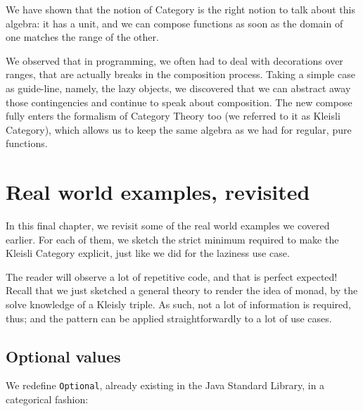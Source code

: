 \documentclass[12pt,a4paper]{report}
\renewcommand{\baselinestretch}{1.5}
\theoremstyle{theorem}
\theoremstyle{definition}
\begin{document}
We have shown that the notion of Category is the right notion to
talk about this algebra: it has a unit, and we can compose functions
as soon as the domain of one matches the range of the other.

We observed that in programming, we often had to deal with decorations
over ranges, that are actually breaks in the composition process.
Taking a simple case as guide-line, namely, the lazy objects, we discovered
that we can abstract away those contingencies and continue to speak
about composition. The new compose fully enters the formalism of
Category Theory too (we referred to it as Kleisli Category), which
allows us to keep the same algebra as we had for regular, pure functions.

\chapter{Real world examples, revisited}

In this final chapter, we revisit some of the real world examples
we covered earlier. For each of them, we sketch the strict minimum
required to make the Kleisli Category explicit, just like we did
for the laziness use case.

The reader will observe a lot of repetitive code,
and that is perfect expected! Recall that we just sketched a general
theory to render the idea of monad, by the solve knowledge
of a Kleisly triple. As such, not a lot of information is required, thus;
and the pattern can be applied straightforwardly to a lot of use cases.

\section{Optional values}

We redefine \lstinline{Optional}{}, already existing in the
Java Standard Library, in a categorical fashion:

\renewcommand{\baselinestretch}{1} 
\selectfont
\end{document}
